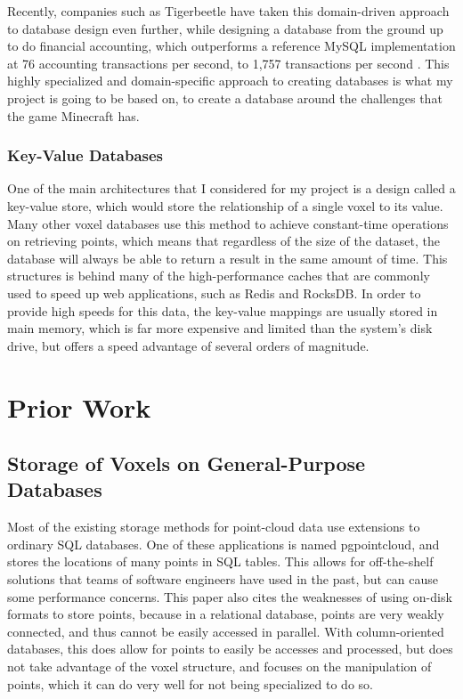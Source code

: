 \documentclass[10pt,twocolumn]{article}
\begin{document}
Recently, companies such as Tigerbeetle\cite{tigerbeetleDesign} have taken this
domain-driven approach to database design even further, while designing a
database from the ground up to do financial accounting, which outperforms a
reference MySQL implementation at 76 accounting transactions per second, to
1,757 transactions per second \cite{tigerbeetlePerf}. This highly specialized
and domain-specific approach to creating databases is what my project is going
to be based on, to create a database around the challenges that the game
Minecraft has.

\subsubsection{Key-Value Databases}

One of the main architectures that I considered for my project is a design
called a key-value store\cite{kvdatabase}, which would store the relationship of
a single voxel to its value. Many other voxel databases use this method to
achieve constant-time operations on retrieving points, which means that
regardless of the size of the dataset, the database will always be able to
return a result in the same amount of time. This structures is behind many of
the high-performance caches that are commonly used to speed up web applications,
such as Redis and RocksDB\cite{dong2021rocksdb}. In order to provide high speeds
for this data, the key-value mappings are usually stored in main memory, which
is far more expensive and limited than the system's disk drive, but offers
a speed advantage of several orders of magnitude\cite{latencyKnow}.

\section{Prior Work}

\subsection{Storage of Voxels on General-Purpose Databases}

Most of the existing storage methods for point-cloud data use extensions to
ordinary SQL databases. One of these applications is named pgpointcloud, and
stores the locations of many points in SQL tables\cite{cura2017scalable}. This
allows for off-the-shelf solutions that teams of software engineers have used in
the past, but can cause some performance concerns. This paper also cites the
weaknesses of using on-disk formats to store points, because in a relational
database, points are very weakly connected, and thus cannot be easily accessed
in parallel. With column-oriented databases, this does allow for points to
easily be accesses and processed, but does not take advantage of the voxel
structure, and focuses on the manipulation of points, which it can do very well
for not being specialized to do so.
\end{document}
